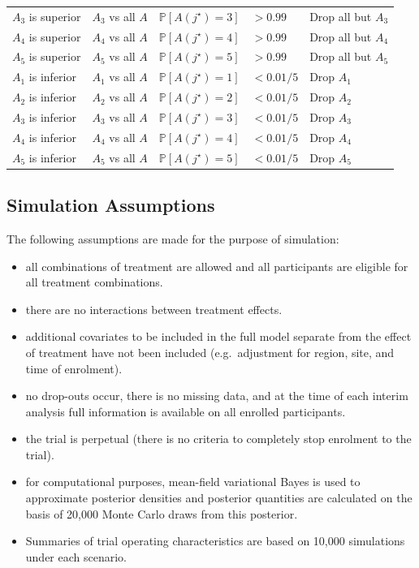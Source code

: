 \documentclass[
]{article}
\providecommand{\tightlist}{%
  \setlength{\itemsep}{0pt}\setlength{\parskip}{0pt}}
\begin{document}
\begin{table}[H]
\begin{tabular}[t]{lllll}
$A_3$ is superior & $A_3$ vs all $A$ & $\mathbb P[A(j^\star)=3]$ & $>0.99$ & Drop all but $A_3$\\
$A_4$ is superior & $A_4$ vs all $A$ & $\mathbb P[A(j^\star)=4]$ & $>0.99$ & Drop all but $A_4$\\
$A_5$ is superior & $A_5$ vs all $A$ & $\mathbb P[A(j^\star)=5]$ & $>0.99$ & Drop all but $A_5$\\
$A_1$ is inferior & $A_1$ vs all $A$ & $\mathbb P[A(j^\star)=1]$ & $<0.01/5$ & Drop $A_1$\\
$A_2$ is inferior & $A_2$ vs all $A$ & $\mathbb P[A(j^\star)=2]$ & $<0.01/5$ & Drop $A_2$\\
$A_3$ is inferior & $A_3$ vs all $A$ & $\mathbb P[A(j^\star)=3]$ & $<0.01/5$ & Drop $A_3$\\
$A_4$ is inferior & $A_4$ vs all $A$ & $\mathbb P[A(j^\star)=4]$ & $<0.01/5$ & Drop $A_4$\\
$A_5$ is inferior & $A_5$ vs all $A$ & $\mathbb P[A(j^\star)=5]$ & $<0.01/5$ & Drop $A_5$\\
\bottomrule
\end{tabular}
\end{table}

\hypertarget{simulation-assumptions}{%
\subsection{Simulation Assumptions}\label{simulation-assumptions}}

The following assumptions are made for the purpose of simulation:

\begin{itemize}
\tightlist
\item
  all combinations of treatment are allowed and all participants are eligible for all treatment combinations.
\item
  there are no interactions between treatment effects.
\item
  additional covariates to be included in the full model separate from the effect of treatment have not been included (e.g.~adjustment for region, site, and time of enrolment).
\item
  no drop-outs occur, there is no missing data, and at the time of each interim analysis full information is available on all enrolled participants.
\item
  the trial is perpetual (there is no criteria to completely stop enrolment to the trial).
\item
  for computational purposes, mean-field variational Bayes is used to approximate posterior densities and posterior quantities are calculated on the basis of 20,000 Monte Carlo draws from this posterior.
\item
  Summaries of trial operating characteristics are based on 10,000 simulations under each scenario.
\end{itemize}
\end{document}
